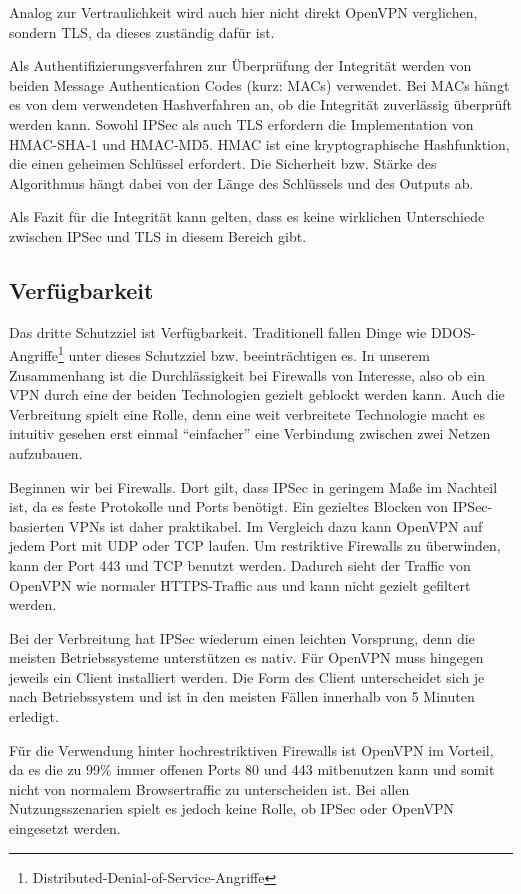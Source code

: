 \documentclass[12pt]{scrartcl}
\begin{document}
Analog zur Vertraulichkeit wird auch hier nicht direkt OpenVPN verglichen, sondern TLS, da dieses zuständig dafür ist.

Als Authentifizierungsverfahren zur Überprüfung der Integrität werden von beiden Message Authentication Codes (kurz: MACs) verwendet. Bei MACs hängt es von dem verwendeten Hashverfahren an, ob die Integrität zuverlässig überprüft werden kann. Sowohl IPSec als auch TLS erfordern die Implementation von HMAC-SHA-1 und HMAC-MD5. HMAC ist eine kryptographische Hashfunktion, die einen geheimen Schlüssel erfordert. Die Sicherheit bzw. Stärke des Algorithmus hängt dabei von der Länge des Schlüssels und des Outputs ab.\cite{Alshamsi2005}

Als Fazit für die Integrität kann gelten, dass es keine wirklichen Unterschiede zwischen IPSec und TLS in diesem Bereich gibt.

\subsection{Verfügbarkeit}
Das dritte Schutzziel ist Verfügbarkeit. Traditionell fallen Dinge wie DDOS-Angriffe\footnote{Distributed-Denial-of-Service-Angriffe} unter dieses Schutzziel bzw. beeinträchtigen es. In unserem Zusammenhang ist die Durchlässigkeit bei Firewalls von Interesse, also ob ein VPN durch eine der beiden Technologien gezielt geblockt werden kann. Auch die Verbreitung spielt eine Rolle, denn eine weit verbreitete Technologie macht es intuitiv gesehen erst einmal "`einfacher"' eine Verbindung zwischen zwei Netzen aufzubauen.

Beginnen wir bei Firewalls. Dort gilt, dass IPSec in geringem Maße im Nachteil ist, da es feste Protokolle und Ports benötigt. Ein gezieltes Blocken von IPSec-basierten VPNs ist daher praktikabel. Im Vergleich dazu kann OpenVPN auf jedem Port mit UDP oder TCP laufen. Um restriktive Firewalls zu überwinden, kann der Port 443 und TCP benutzt werden. Dadurch sieht der Traffic von OpenVPN wie normaler HTTPS-Traffic aus und kann nicht gezielt gefiltert werden.\cite{ivpn.net}

Bei der Verbreitung hat IPSec wiederum einen leichten Vorsprung, denn die meisten Betriebssysteme unterstützen es nativ. Für OpenVPN muss hingegen jeweils ein Client installiert werden. Die Form des Client unterscheidet sich je nach Betriebssystem und ist in den meisten Fällen innerhalb von 5 Minuten erledigt.\cite{ivpn.net}

Für die Verwendung hinter hochrestriktiven Firewalls ist OpenVPN im Vorteil, da es die zu 99\% immer offenen Ports 80 und 443 mitbenutzen kann und somit nicht von normalem Browsertraffic zu unterscheiden ist. Bei allen Nutzungsszenarien spielt es jedoch keine Rolle, ob IPSec oder OpenVPN eingesetzt werden.
\end{document}
